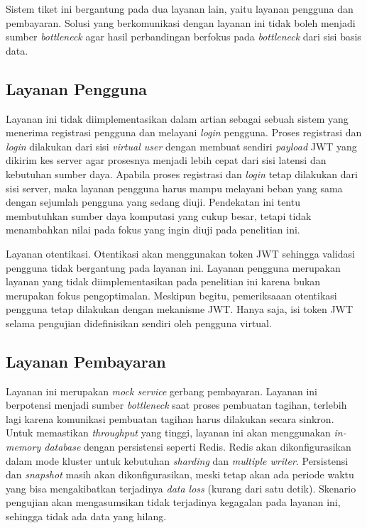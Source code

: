 Sistem tiket ini bergantung pada dua layanan lain, yaitu layanan pengguna dan pembayaran. Solusi yang berkomunikasi dengan layanan ini tidak boleh menjadi sumber \textit{bottleneck} agar hasil perbandingan berfokus pada \textit{bottleneck} dari sisi basis data.

\subsection{Layanan Pengguna}

Layanan ini tidak diimplementasikan dalam artian sebagai sebuah sistem yang menerima registrasi pengguna dan melayani \textit{login} pengguna. Proses registrasi dan \textit{login} dilakukan dari sisi \textit{virtual user} dengan membuat sendiri \textit{payload} JWT yang dikirim kes server agar prosesnya menjadi lebih cepat dari sisi latensi dan kebutuhan sumber daya. Apabila proses registrasi dan \textit{login} tetap dilakukan dari sisi server, maka layanan pengguna harus mampu melayani beban yang sama dengan sejumlah pengguna yang sedang diuji. Pendekatan ini tentu membutuhkan sumber daya komputasi yang cukup besar, tetapi tidak menambahkan nilai pada fokus yang ingin diuji pada penelitian ini.

Layanan otentikasi. Otentikasi akan menggunakan token JWT sehingga validasi pengguna tidak bergantung pada layanan ini. Layanan pengguna merupakan layanan yang tidak diimplementasikan pada penelitian ini karena bukan merupakan fokus pengoptimalan. Meskipun begitu, pemeriksaaan otentikasi pengguna tetap dilakukan dengan mekanisme JWT. Hanya saja, isi token JWT selama pengujian didefinisikan sendiri oleh pengguna virtual.

\subsection{Layanan Pembayaran}

Layanan ini merupakan \textit{mock service} gerbang pembayaran. Layanan ini berpotensi menjadi sumber \textit{bottleneck} saat proses pembuatan tagihan, terlebih lagi karena komunikasi pembuatan tagihan harus dilakukan secara sinkron. Untuk memastikan \textit{throughput} yang tinggi, layanan ini akan menggunakan \textit{in-memory database} dengan persistensi seperti Redis. Redis akan dikonfigurasikan dalam mode kluster untuk kebutuhan \textit{sharding} dan \textit{multiple writer}. Persistensi dan \textit{snapshot} masih akan dikonfigurasikan, meski tetap akan ada periode waktu yang bisa mengakibatkan terjadinya \textit{data loss} (kurang dari satu detik). Skenario pengujian akan mengasumsikan tidak terjadinya kegagalan pada layanan ini, sehingga tidak ada data yang hilang.

